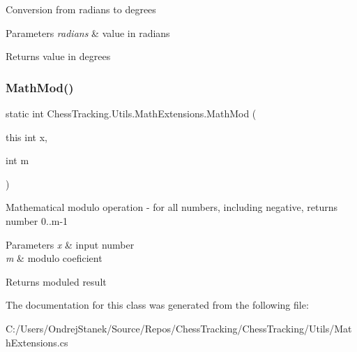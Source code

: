 Conversion from radians to degrees 


\begin{DoxyParams}{Parameters}
{\em radians} & value in radians\\
\hline
\end{DoxyParams}
\begin{DoxyReturn}{Returns}
value in degrees
\end{DoxyReturn}
\mbox{\label{class_chess_tracking_1_1_utils_1_1_math_extensions_a50e8ab853617eda2cc9a241a350b5419}} 
\subsubsection{\texorpdfstring{MathMod()}{MathMod()}}
{\footnotesize\ttfamily static int Chess\+Tracking.\+Utils.\+Math\+Extensions.\+Math\+Mod (\begin{DoxyParamCaption}\item[{this int}]{x,  }\item[{int}]{m }\end{DoxyParamCaption})\hspace{0.3cm}{\ttfamily [static]}}



Mathematical modulo operation -\/ for all numbers, including negative, returns number 0..m-\/1 


\begin{DoxyParams}{Parameters}
{\em x} & input number\\
\hline
{\em m} & modulo coeficient\\
\hline
\end{DoxyParams}
\begin{DoxyReturn}{Returns}
moduled result
\end{DoxyReturn}


The documentation for this class was generated from the following file\+:\begin{DoxyCompactItemize}
\item 
C\+:/\+Users/\+Ondrej\+Stanek/\+Source/\+Repos/\+Chess\+Tracking/\+Chess\+Tracking/\+Utils/Math\+Extensions.\+cs\end{DoxyCompactItemize}
